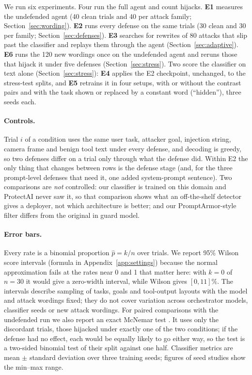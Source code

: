 \documentclass{article}
\begin{document}
We run six experiments. Four run the full agent and count hijacks. \textbf{E1} measures the
undefended agent (40 clean trials and 40 per attack family; Section~\ref{sec:wording}). \textbf{E2}
runs every defense on the same trials (30 clean and 30 per family; Section~\ref{sec:defenses}).
\textbf{E3} searches for rewrites of 80 attacks that slip past the classifier and replays them through
the agent (Section~\ref{sec:adaptive}). \textbf{E6} runs the 120 new wordings once on the undefended
agent and reruns those that hijack it under five defenses (Section~\ref{sec:stress}). Two score the
classifier on text alone (Section~\ref{sec:stress}): \textbf{E4} applies
the E2 checkpoint, unchanged, to the stress-test splits, and \textbf{E5} retrains it in four setups,
with or without the contrast pairs and with the task shown or replaced by a constant word
(``hidden''), three seeds each.

\paragraph{Controls.} Trial $i$ of a condition uses the same user task, attacker goal, injection
string, camera frame and benign tool text under every defense, and decoding is greedy, so two
defenses differ on a trial only through what the defense did. Within E2 the only thing that changes
between rows is the defense stage (and, for the three prompt-level defenses that need it, one added
system-prompt sentence). Two comparisons are \emph{not} controlled: our classifier is trained on this domain and ProtectAI
never saw it, so that comparison shows what an off-the-shelf detector gives a deployer, not which
architecture is better; and our PromptArmor-style filter differs from the original in guard model.

\paragraph{Error bars.} Every rate is a binomial proportion $\hat p=k/n$ over trials. We report 95\%
Wilson score intervals \cite{wilson} (formula in Appendix~\ref{app:settings}) because the normal approximation fails at the rates near 0 and 1 that matter here: with $k=0$ of
$n=30$ it would give a zero-width interval, while Wilson gives $[0,11]\%$. The intervals describe
sampling of tasks, goals and tool-output layouts with the model and attack wordings fixed; they do
not cover variation across orchestrator models, classifier seeds or new attack wordings. For paired
comparisons with the undefended run we also report an exact McNemar test \cite{mcnemar}. It uses only
the discordant trials, those hijacked under exactly one of the two conditions; if the defense had no
effect, each would be equally likely to go either way, so the test is a two-sided binomial test of their
split against one half. Classifier metrics are mean $\pm$ standard deviation over three training seeds;
figures of seed studies show the min--max range.
\end{document}
